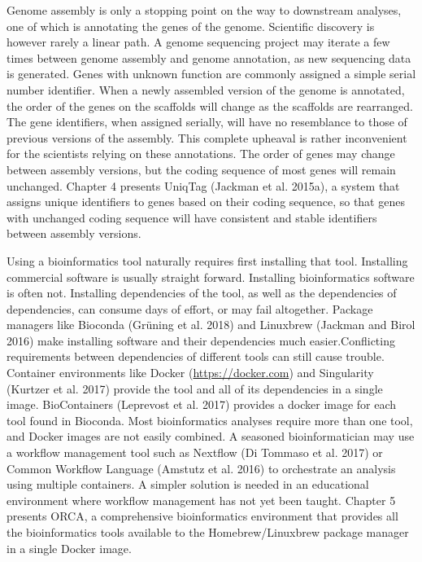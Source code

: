 \documentclass[
  12pt,
  oneside,
  openany]{book}
\begin{document}
Genome assembly is only a stopping point on the way to downstream analyses, one of which is annotating the genes of the genome. Scientific discovery is however rarely a linear path. A genome sequencing project may iterate a few times between genome assembly and genome annotation, as new sequencing data is generated. Genes with unknown function are commonly assigned a simple serial number identifier. When a newly assembled version of the genome is annotated, the order of the genes on the scaffolds will change as the scaffolds are rearranged. The gene identifiers, when assigned serially, will have no resemblance to those of previous versions of the assembly. This complete upheaval is rather inconvenient for the scientists relying on these annotations. The order of genes may change between assembly versions, but the coding sequence of most genes will remain unchanged. Chapter 4 presents UniqTag (Jackman et al. 2015a), a system that assigns unique identifiers to genes based on their coding sequence, so that genes with unchanged coding sequence will have consistent and stable identifiers between assembly versions.

Using a bioinformatics tool naturally requires first installing that tool. Installing commercial software is usually straight forward. Installing bioinformatics software is often not. Installing dependencies of the tool, as well as the dependencies of dependencies, can consume days of effort, or may fail altogether. Package managers like Bioconda (Grüning et al. 2018) and Linuxbrew (Jackman and Birol 2016) make installing software and their dependencies much easier.Conflicting requirements between dependencies of different tools can still cause trouble. Container environments like Docker (\url{https://docker.com}) and Singularity (Kurtzer et al. 2017) provide the tool and all of its dependencies in a single image. BioContainers (Leprevost et al. 2017) provides a docker image for each tool found in Bioconda. Most bioinformatics analyses require more than one tool, and Docker images are not easily combined. A seasoned bioinformatician may use a workflow management tool such as Nextflow (Di Tommaso et al. 2017) or Common Workflow Language (Amstutz et al. 2016) to orchestrate an analysis using multiple containers. A simpler solution is needed in an educational environment where workflow management has not yet been taught. Chapter 5 presents ORCA, a comprehensive bioinformatics environment that provides all the bioinformatics tools available to the Homebrew/Linuxbrew package manager in a single Docker image.
\end{document}
